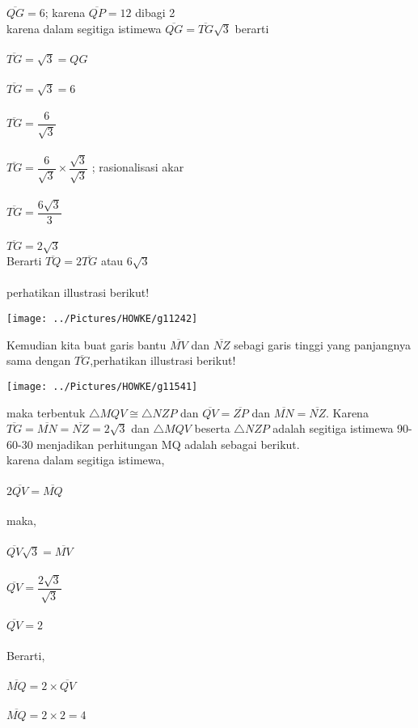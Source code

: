 \documentclass[12pt,a4paper]{article}
\begin{document}
\begin{enumerate}
		$\overline{QG}=6$; karena $\overline{QP}=12$ dibagi 2
		\\
		karena dalam segitiga istimewa $\overline{QG}=\overline{TG}\sqrt{3}$
		berarti \\
		\\
		$\overline{TG}=\sqrt{3}=QG$\\
		\\
		$\overline{TG}=\sqrt{3}=6$\\
		\\
		$\overline{TG}=\dfrac{6}{\sqrt{3}}$\\
		\\
		$\overline{TG}=\dfrac{6}{\sqrt{3}}\times \dfrac{\sqrt{3}}{\sqrt{3}}$ ; rasionalisasi akar\\
		\\
		$\overline{TG}=\dfrac{6\sqrt{3}}{3}$\\
		\\
		$\overline{TG}=2\sqrt{3}$
		\\
		
		Berarti $\overline{TQ}=2\overline{TG}$ atau $6\sqrt{3}$ \\
		\\
		perhatikan illustrasi berikut!
		\begin{center}
		\texttt{[image: ../Pictures/HOWKE/g11242]}
		\end{center}
		
		Kemudian kita buat garis bantu $\overline{MV}$ dan $\overline{NZ}$ sebagi garis tinggi yang panjangnya sama dengan $\overline{TG}$,perhatikan illustrasi berikut!
		\begin{center}
			\texttt{[image: ../Pictures/HOWKE/g11541]}
		\end{center}
		
		maka terbentuk $\triangle MQV \cong \triangle NZP $ dan  $\overline{QV}=\overline{ZP}$ dan $\overline{MN}= \overline{NZ}$. Karena $\overline{TG}=\overline{MN}=\overline{NZ}=2\sqrt{3}$
		dan $\triangle MQV$ beserta $\triangle NZP$ adalah segitiga istimewa 90-60-30 menjadikan perhitungan MQ adalah sebagai berikut.\\
		
		karena dalam segitiga istimewa,\\
		\\
		$2\overline{QV}=\overline{MQ}$\\
		\\
		maka,\\
		\\
		$\overline{QV}\sqrt{3}=\overline{MV}$\\
		\\
		$\overline{QV}=\dfrac{2\sqrt{3}}{\sqrt{3}}$\\
		\\
		$\overline{QV}=2$\\
		\\
		Berarti,\\
		\\
		$\overline{MQ}=2 \times \overline{QV}$\\
		\\
		$\overline{MQ}=2 \times 2=4$
		

\end{enumerate}
\end{document}
